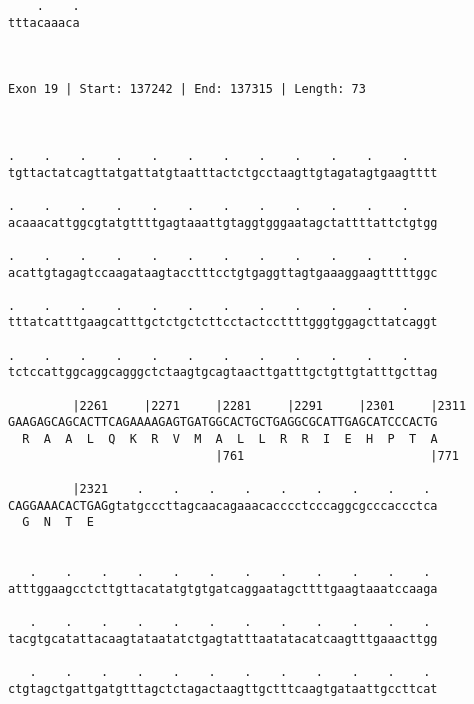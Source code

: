 \documentclass{article}
\begin{document}
\begin{Verbatim}
    .    .
tttacaaaca
          
          
 
Exon 19 | Start: 137242 | End: 137315 | Length: 73



.    .    .    .    .    .    .    .    .    .    .    .    
tgttactatcagttatgattatgtaatttactctgcctaagttgtagatagtgaagtttt
                                                            
.    .    .    .    .    .    .    .    .    .    .    .    
acaaacattggcgtatgttttgagtaaattgtaggtgggaatagctattttattctgtgg
                                                            
.    .    .    .    .    .    .    .    .    .    .    .    
acattgtagagtccaagataagtacctttcctgtgaggttagtgaaaggaagtttttggc
                                                            
.    .    .    .    .    .    .    .    .    .    .    .    
tttatcatttgaagcatttgctctgctcttcctactccttttgggtggagcttatcaggt
                                                            
.    .    .    .    .    .    .    .    .    .    .    .    
tctccattggcaggcagggctctaagtgcagtaacttgatttgctgttgtatttgcttag
                                                            
         |2261     |2271     |2281     |2291     |2301     |2311
GAAGAGCAGCACTTCAGAAAAGAGTGATGGCACTGCTGAGGCGCATTGAGCATCCCACTG
  R  A  A  L  Q  K  R  V  M  A  L  L  R  R  I  E  H  P  T  A
                             |761                          |771
  
         |2321    .    .    .    .    .    .    .    .    . 
CAGGAAACACTGAGgtatgcccttagcaacagaaacacccctcccaggcgcccaccctca
  G  N  T  E                                                
                                                            
  
   .    .    .    .    .    .    .    .    .    .    .    . 
atttggaagcctcttgttacatatgtgtgatcaggaatagcttttgaagtaaatccaaga
                                                            
   .    .    .    .    .    .    .    .    .    .    .    . 
tacgtgcatattacaagtataatatctgagtatttaatatacatcaagtttgaaacttgg
                                                            
   .    .    .    .    .    .    .    .    .    .    .    . 
ctgtagctgattgatgtttagctctagactaagttgctttcaagtgataattgccttcat
                                                            

\end{Verbatim}
\end{document}

